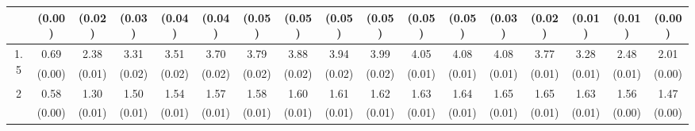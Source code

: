 \documentclass[12pt]{article}  %
\theoremstyle{plain}
\begin{document}
\begin{sidewaystable}[htbp]
\begin{tabular}{ccccccccccccccccc}
                       & (0.00)& (0.02)& (0.03)& (0.04)& (0.04)& (0.05)& (0.05)& (0.05)& (0.05)&  (0.05)&  (0.05)&  (0.03)&  (0.02)&  (0.01)&  (0.01) &   (0.00)\\ \hline                                                                                                                                                                                                                                                                                    
\multirow{2}{*}{1.5}  & 0.69& 2.38 & 3.31 & 3.51 &  3.70  & 3.79  & 3.88  & 3.94 &  3.99 &  4.05 & 4.08 & 4.08 & 3.77 & 3.28 & 2.48  &2.01\\
                      &  (0.00)& (0.01)& (0.02)& (0.02)& (0.02)& (0.02)& (0.02)& (0.02)& (0.02)&  (0.01)&  (0.01)&  (0.01)&  (0.01)&  (0.01) & (0.01) &     (0.00)\\ \hline                                                                                                                                                                                                                                                                                    
\multirow{2}{*}{2}  &0.58 &1.30 & 1.50 & 1.54  & 1.57  & 1.58  & 1.60 &  1.61  & 1.62  & 1.63 & 1.64 & 1.65 & 1.65 & 1.63 & 1.56 & 1.47\\
                      &  (0.00)& (0.01)& (0.01)& (0.01)& (0.01)& (0.01)& (0.01)& (0.01)& (0.01)&  (0.01)&  (0.01)&  (0.01)&  (0.01)&  (0.01)&  (0.00)  &     (0.00)\\ \hline                                                                                                                                                                                                                                                                                    
\end{tabular}
\end{sidewaystable}
\end{document}
